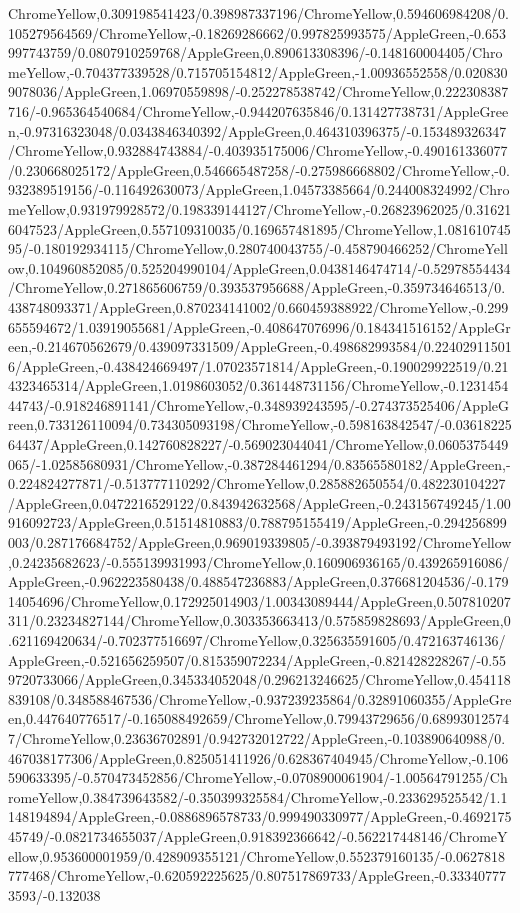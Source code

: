{\begin{tikzternal}
ChromeYellow,0.309198541423/0.398987337196/ChromeYellow,0.594606984208/0.105279564569/ChromeYellow,-0.18269286662/0.997825993575/AppleGreen,-0.653997743759/0.0807910259768/AppleGreen,0.890613308396/-0.148160004405/ChromeYellow,-0.704377339528/0.715705154812/AppleGreen,-1.00936552558/0.0208309078036/AppleGreen,1.06970559898/-0.252278538742/ChromeYellow,0.222308387716/-0.965364540684/ChromeYellow,-0.944207635846/0.131427738731/AppleGreen,-0.97316323048/0.0343846340392/AppleGreen,0.464310396375/-0.153489326347/ChromeYellow,0.932884743884/-0.403935175006/ChromeYellow,-0.490161336077/0.230668025172/AppleGreen,0.546665487258/-0.275986668802/ChromeYellow,-0.932389519156/-0.116492630073/AppleGreen,1.04573385664/0.244008324992/ChromeYellow,0.931979928572/0.198339144127/ChromeYellow,-0.26823962025/0.316216047523/AppleGreen,0.557109310035/0.169657481895/ChromeYellow,1.08161074595/-0.180192934115/ChromeYellow,0.280740043755/-0.458790466252/ChromeYellow,0.104960852085/0.525204990104/AppleGreen,0.0438146474714/-0.52978554434/ChromeYellow,0.271865606759/0.393537956688/AppleGreen,-0.359734646513/0.438748093371/AppleGreen,0.870234141002/0.660459388922/ChromeYellow,-0.299655594672/1.03919055681/AppleGreen,-0.408647076996/0.184341516152/AppleGreen,-0.214670562679/0.439097331509/AppleGreen,-0.498682993584/0.224029115016/AppleGreen,-0.438424669497/1.07023571814/AppleGreen,-0.190029922519/0.214323465314/AppleGreen,1.0198603052/0.361448731156/ChromeYellow,-0.123145444743/-0.918246891141/ChromeYellow,-0.348939243595/-0.274373525406/AppleGreen,0.733126110094/0.734305093198/ChromeYellow,-0.598163842547/-0.0361822564437/AppleGreen,0.142760828227/-0.569023044041/ChromeYellow,0.0605375449065/-1.02585680931/ChromeYellow,-0.387284461294/0.83565580182/AppleGreen,-0.224824277871/-0.513777110292/ChromeYellow,0.285882650554/0.482230104227/AppleGreen,0.0472216529122/0.843942632568/AppleGreen,-0.243156749245/1.00916092723/AppleGreen,0.51514810883/0.788795155419/AppleGreen,-0.294256899003/0.287176684752/AppleGreen,0.969019339805/-0.393879493192/ChromeYellow,0.24235682623/-0.555139931993/ChromeYellow,0.160906936165/0.439265916086/AppleGreen,-0.962223580438/0.488547236883/AppleGreen,0.376681204536/-0.17914054696/ChromeYellow,0.172925014903/1.00343089444/AppleGreen,0.507810207311/0.23234827144/ChromeYellow,0.303353663413/0.575859828693/AppleGreen,0.621169420634/-0.702377516697/ChromeYellow,0.325635591605/0.472163746136/AppleGreen,-0.521656259507/0.815359072234/AppleGreen,-0.821428228267/-0.559720733066/AppleGreen,0.345334052048/0.296213246625/ChromeYellow,0.454118839108/0.348588467536/ChromeYellow,-0.937239235864/0.32891060355/AppleGreen,0.447640776517/-0.165088492659/ChromeYellow,0.79943729656/0.689930125747/ChromeYellow,0.23636702891/0.942732012722/AppleGreen,-0.103890640988/0.467038177306/AppleGreen,0.825051411926/0.628367404945/ChromeYellow,-0.106590633395/-0.570473452856/ChromeYellow,-0.0708900061904/-1.00564791255/ChromeYellow,0.384739643582/-0.350399325584/ChromeYellow,-0.233629525542/1.1148194894/AppleGreen,-0.0886896578733/0.999490330977/AppleGreen,-0.469217545749/-0.0821734655037/AppleGreen,0.918392366642/-0.562217448146/ChromeYellow,0.953600001959/0.428909355121/ChromeYellow,0.552379160135/-0.0627818777468/ChromeYellow,-0.620592225625/0.807517869733/AppleGreen,-0.333407773593/-0.132038
\end{tikzternal}}
